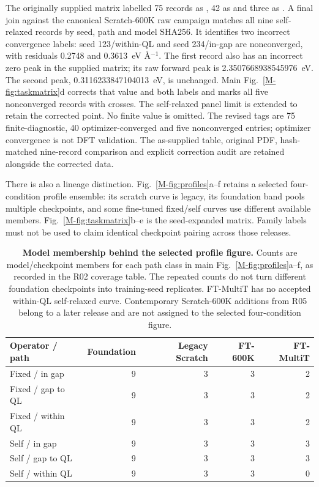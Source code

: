 \documentclass[pdflatex,sn-mathphys-num]{sn-jnl}
\newcommand{\file}[1]{\texttt{\detokenize{#1}}}
\begin{document}
The originally supplied matrix labelled 75 records as \file{FINITE_DIAGNOSTIC}, 42 as \file{CONVERGED} and three as \file{NONCONVERGED}. A final join against the canonical Scratch-600K raw campaign matches all nine self-relaxed records by seed, path and model SHA256. It identifies two incorrect convergence labels: seed 123/within-QL and seed 234/in-gap are nonconverged, with residuals 0.2748 and 0.3613~eV \AA$^{-1}$. The first record also has an incorrect zero peak in the supplied matrix; its raw forward peak is 2.3507668938545976~eV. The second peak, 0.3116233847104013~eV, is unchanged. Main Fig.~\ref{M-fig:taskmatrix}d corrects that value and both labels and marks all five nonconverged records with crosses. The self-relaxed panel limit is extended to retain the corrected point. No finite value is omitted. The revised tags are 75 finite-diagnostic, 40 optimizer-converged and five nonconverged entries; optimizer convergence is not DFT validation. The as-supplied table, original PDF, hash-matched nine-record comparison and explicit correction audit are retained alongside the corrected data.

There is also a lineage distinction. Fig.~\ref{M-fig:profiles}a--f retains a selected four-condition profile ensemble: its scratch curve is legacy, its foundation band pools multiple checkpoints, and some fine-tuned fixed/self curves use different available members. Fig.~\ref{M-fig:taskmatrix}b--e is the seed-expanded matrix. Family labels must not be used to claim identical checkpoint pairing across those releases.

\begin{table}[htbp]
\centering\scriptsize
\caption{\textbf{Model membership behind the selected profile figure.} Counts are model/checkpoint members for each path class in main Fig.~\ref{M-fig:profiles}a--f, as recorded in the R02 coverage table. The repeated counts do not turn different foundation checkpoints into training-seed replicates. FT-MultiT has no accepted within-QL self-relaxed curve. Contemporary Scratch-600K additions from R05 belong to a later release and are not assigned to the selected four-condition figure.}
\label{tab:profile_coverage}
\begin{tabular}{lrrrr}
\toprule
Operator / path & Foundation & Legacy Scratch & FT-600K & FT-MultiT\\
\midrule
Fixed / in gap & 9 & 3 & 3 & 2\\
Fixed / gap to QL & 9 & 3 & 3 & 2\\
Fixed / within QL & 9 & 3 & 3 & 2\\
Self / in gap & 9 & 3 & 3 & 3\\
Self / gap to QL & 9 & 3 & 3 & 3\\
Self / within QL & 9 & 3 & 3 & 0\\
\bottomrule
\end{tabular}
\end{table}
\end{document}
